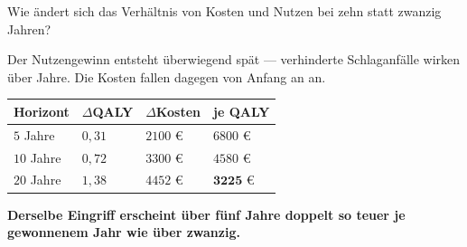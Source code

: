 \begin{aufgabe}
Wie ändert sich das Verhältnis von Kosten und Nutzen bei zehn statt zwanzig Jahren?

\loesung
{}
Der Nutzengewinn entsteht überwiegend spät --- verhinderte Schlaganfälle wirken über Jahre. Die Kosten fallen dagegen von Anfang an an.

\begin{center}
{\small
\renewcommand{\arraystretch}{1.48}
\begin{tabular}{@{}P{2.4cm}P{2.0cm}P{2.0cm}P{2.2cm}@{}}
\toprule
\textbf{Horizont} & $\Delta$QALY & $\Delta$Kosten & \textbf{je QALY}\\
\midrule
$5$ Jahre & $0{,}31$ & $2100$ € & $6800$ €\\
$10$ Jahre & $0{,}72$ & $3300$ € & $4580$ €\\
$20$ Jahre & $1{,}38$ & $4452$ € & $\mathbf{3225}$ €\\
\bottomrule
\end{tabular}}
\end{center}

\begin{center}
\begin{minipage}{0.9\textwidth}
\textbf{Derselbe Eingriff erscheint über fünf Jahre doppelt so teuer je gewonnenem Jahr wie über zwanzig.}
\end{minipage}
\end{center}

\begin{center}
\begin{minipage}{0.88\textwidth}
\end{minipage}
\end{center}
\end{aufgabe}

